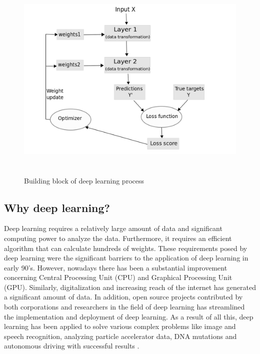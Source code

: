 \begin{figure}[ht]
	\begin{center}
		\includegraphics[width=12cm,height=10cm,keepaspectratio]{images/deep_learning_basics.png}
		\caption{Building block of deep learning process }
		\label{fig:deep learning architecture}
	\end{center}
\end{figure}

\subsection{Why deep learning?}

Deep learning requires a relatively large amount of data and significant computing power to analyze the data. Furthermore, it  requires an efficient algorithm that can calculate hundreds of weights. These requirements posed by deep learning were the significant barriers to the application of deep learning in early 90's. However, nowadays there has been a substantial improvement concerning Central Processing Unit (CPU) and Graphical Processing Unit (GPU). Similarly, digitalization and increasing reach of the internet has generated a significant amount of data. In addition, open source projects contributed by both corporations and researchers in the field of deep learning has streamlined the implementation and deployment of deep learning. As a result of all this, deep learning has been applied to solve various complex problems like image and speech recognition, analyzing particle accelerator data, DNA mutations and autonomous driving with successful results \citep{lecun2015deep}. 
 

